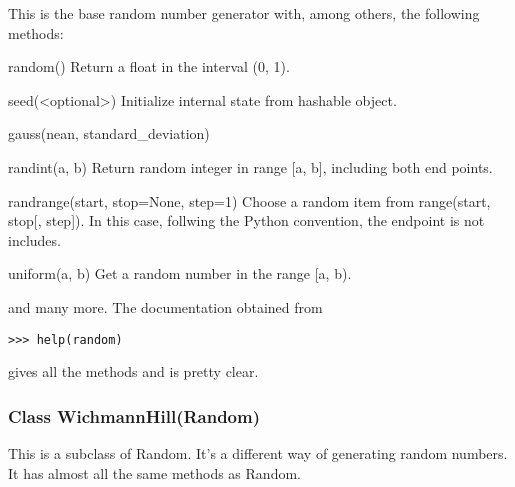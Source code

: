 \documentclass{article}
\begin{document}
This is the base random number generator with, among others,
 the following methods:
\begin{description}
\item{{\ttfamily random()}}
      Return a float in the interval (0, 1).
\item{{\ttfamily seed(<optional>)}} Initialize internal state from hashable object.
\item{{\ttfamily gauss(nean, standard\_deviation)}}
\item{{\ttfamily randint(a, b)}}
      Return random integer in range [a, b], including both end points.
\item{{\ttfamily randrange(start, stop=None, step=1)}}
      Choose a random item from\linebreak
       range(start, stop[, step]). In this case,
      follwing the Python convention, the endpoint is not includes.
\item{{\ttfamily uniform(a, b)}}
      Get a random number in the range [a, b).
\end{description}
and many more. The documentation obtained from
\begin{verbatim}
>>> help(random)
\end{verbatim}
gives all the methods and is pretty clear.

\subsubsection{Class {\ttfamily WichmannHill(Random)}}

This is a subclass of {\ttfamily Random}.
It's a different way of generating random numbers.  It has almost all the same
methods as {\ttfamily Random}.
\end{document}
